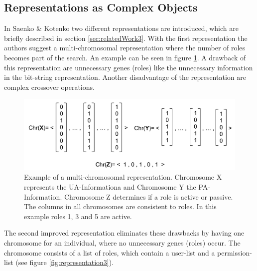         \subsection{Representations as Complex Objects}
        In Saenko \& Kotenko\cite{saenko2012design} two different representations are introduced, which are briefly described in section \ref{sec:relatedWork3}. With the first representation the authors suggest a multi-chromosomal representation where the number of roles becomes part of the search. An example can be seen in figure \ref{fig:representation2}. A drawback of this representation are unnecessary genes (roles) like the unnecessary information in the bit-string representation. Another disadvantage of the representation are complex crossover operations\cite{saenko2012design}.
        \begin{figure}
            \centering
            \includegraphics[scale=0.5]{./Figures/ComplexRepresentation1}
            \caption{Example of a multi-chromosomal representation. Chromosome X represents the UA-Informationa and Chromosome Y the PA-Information. Chromosome Z determines if a role is active or passive. The columns in all chromosomes are consistent to roles. In this example roles 1, 3 and 5 are active.}
            \label{fig:representation2}
        \end{figure}
        The second improved representation eliminates these drawbacks by having one chromosome for an individual, where no unnecessary genes (roles) occur. The chromosome consists of a list of roles, which contain a user-list and a permission-list (see figure \ref{fig:representation3}).\\

